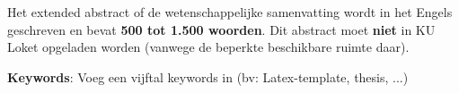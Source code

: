 Het extended abstract of de wetenschappelijke samenvatting wordt in het Engels geschreven en bevat {\bf 500 tot 1.500 woorden}. Dit abstract moet {\bf niet} in KU Loket opgeladen worden (vanwege de beperkte beschikbare ruimte daar).

\textbf{Keywords}: Voeg een vijftal keywords in (bv: Latex-template, thesis, ...)
